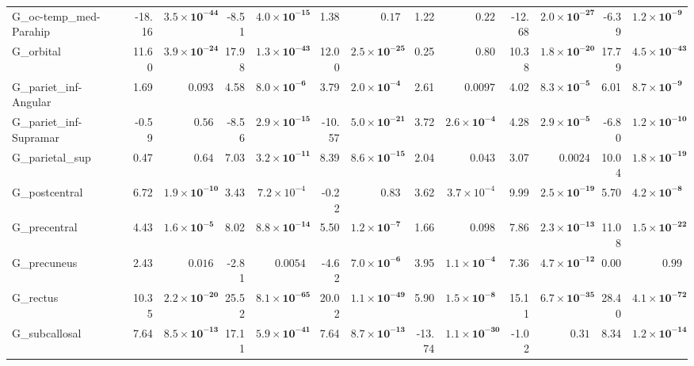 {\begin{longtable}{llrrrrrrrrrrrr}
G\_oc-temp\_med-Parahip &  & -18.16 & $\mathbf{3.5{\times}10^{-44}}$ & -8.51 & $\mathbf{4.0{\times}10^{-15}}$ & 1.38 & $0.17$ & 1.22 & $0.22$ & -12.68 & $\mathbf{2.0{\times}10^{-27}}$ & -6.39 & $\mathbf{1.2{\times}10^{-9}}$ \\
G\_orbital &  & 11.60 & $\mathbf{3.9{\times}10^{-24}}$ & 17.98 & $\mathbf{1.3{\times}10^{-43}}$ & 12.00 & $\mathbf{2.5{\times}10^{-25}}$ & 0.25 & $0.80$ & 10.38 & $\mathbf{1.8{\times}10^{-20}}$ & 17.79 & $\mathbf{4.5{\times}10^{-43}}$ \\
G\_pariet\_inf-Angular &  & 1.69 & $0.093$ & 4.58 & $\mathbf{8.0{\times}10^{-6}}$ & 3.79 & $\mathbf{2.0{\times}10^{-4}}$ & 2.61 & $0.0097$ & 4.02 & $\mathbf{8.3{\times}10^{-5}}$ & 6.01 & $\mathbf{8.7{\times}10^{-9}}$ \\
G\_pariet\_inf-Supramar &  & -0.59 & $0.56$ & -8.56 & $\mathbf{2.9{\times}10^{-15}}$ & -10.57 & $\mathbf{5.0{\times}10^{-21}}$ & 3.72 & $\mathbf{2.6{\times}10^{-4}}$ & 4.28 & $\mathbf{2.9{\times}10^{-5}}$ & -6.80 & $\mathbf{1.2{\times}10^{-10}}$ \\
G\_parietal\_sup &  & 0.47 & $0.64$ & 7.03 & $\mathbf{3.2{\times}10^{-11}}$ & 8.39 & $\mathbf{8.6{\times}10^{-15}}$ & 2.04 & $0.043$ & 3.07 & $0.0024$ & 10.04 & $\mathbf{1.8{\times}10^{-19}}$ \\
G\_postcentral &  & 6.72 & $\mathbf{1.9{\times}10^{-10}}$ & 3.43 & $7.2{\times}10^{-4}$ & -0.22 & $0.83$ & 3.62 & $3.7{\times}10^{-4}$ & 9.99 & $\mathbf{2.5{\times}10^{-19}}$ & 5.70 & $\mathbf{4.2{\times}10^{-8}}$ \\
G\_precentral &  & 4.43 & $\mathbf{1.6{\times}10^{-5}}$ & 8.02 & $\mathbf{8.8{\times}10^{-14}}$ & 5.50 & $\mathbf{1.2{\times}10^{-7}}$ & 1.66 & $0.098$ & 7.86 & $\mathbf{2.3{\times}10^{-13}}$ & 11.08 & $\mathbf{1.5{\times}10^{-22}}$ \\
G\_precuneus &  & 2.43 & $0.016$ & -2.81 & $0.0054$ & -4.62 & $\mathbf{7.0{\times}10^{-6}}$ & 3.95 & $\mathbf{1.1{\times}10^{-4}}$ & 7.36 & $\mathbf{4.7{\times}10^{-12}}$ & 0.00 & $0.99$ \\
G\_rectus &  & 10.35 & $\mathbf{2.2{\times}10^{-20}}$ & 25.52 & $\mathbf{8.1{\times}10^{-65}}$ & 20.02 & $\mathbf{1.1{\times}10^{-49}}$ & 5.90 & $\mathbf{1.5{\times}10^{-8}}$ & 15.11 & $\mathbf{6.7{\times}10^{-35}}$ & 28.40 & $\mathbf{4.1{\times}10^{-72}}$ \\
G\_subcallosal &  & 7.64 & $\mathbf{8.5{\times}10^{-13}}$ & 17.11 & $\mathbf{5.9{\times}10^{-41}}$ & 7.64 & $\mathbf{8.7{\times}10^{-13}}$ & -13.74 & $\mathbf{1.1{\times}10^{-30}}$ & -1.02 & $0.31$ & 8.34 & $\mathbf{1.2{\times}10^{-14}}$ \\

\end{longtable}}
